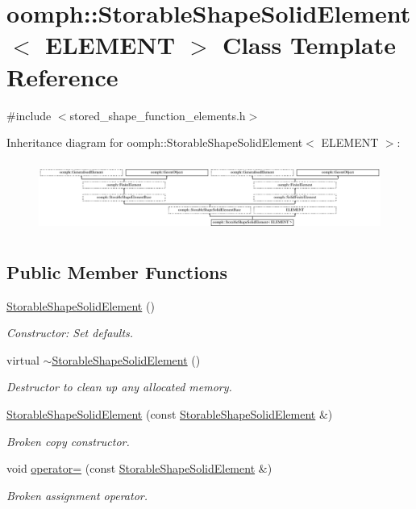 \hypertarget{classoomph_1_1StorableShapeSolidElement}{}\section{oomph\+:\+:Storable\+Shape\+Solid\+Element$<$ E\+L\+E\+M\+E\+NT $>$ Class Template Reference}
\label{classoomph_1_1StorableShapeSolidElement}


{\ttfamily \#include $<$stored\+\_\+shape\+\_\+function\+\_\+elements.\+h$>$}

Inheritance diagram for oomph\+:\+:Storable\+Shape\+Solid\+Element$<$ E\+L\+E\+M\+E\+NT $>$\+:\begin{figure}[H]
\begin{center}
\leavevmode
\includegraphics[height=2.333333cm]{classoomph_1_1StorableShapeSolidElement}
\end{center}
\end{figure}
\subsection*{Public Member Functions}
\begin{DoxyCompactItemize}
\item 
\hyperlink{classoomph_1_1StorableShapeSolidElement_a8f5bbc17bdcf01df0f9d924a67c0139d}{Storable\+Shape\+Solid\+Element} ()
\begin{DoxyCompactList}\small\item\em Constructor\+: Set defaults. \end{DoxyCompactList}\item 
virtual \hyperlink{classoomph_1_1StorableShapeSolidElement_ae5d33f517e64c4fcee7e07a6cf4e63bb}{$\sim$\+Storable\+Shape\+Solid\+Element} ()
\begin{DoxyCompactList}\small\item\em Destructor to clean up any allocated memory. \end{DoxyCompactList}\item 
\hyperlink{classoomph_1_1StorableShapeSolidElement_a7576ba483d40ebc5d9b93695a83c59ac}{Storable\+Shape\+Solid\+Element} (const \hyperlink{classoomph_1_1StorableShapeSolidElement}{Storable\+Shape\+Solid\+Element} \&)
\begin{DoxyCompactList}\small\item\em Broken copy constructor. \end{DoxyCompactList}\item 
void \hyperlink{classoomph_1_1StorableShapeSolidElement_a14294c89e5870f845215e3f04ef40883}{operator=} (const \hyperlink{classoomph_1_1StorableShapeSolidElement}{Storable\+Shape\+Solid\+Element} \&)
\begin{DoxyCompactList}\small\item\em Broken assignment operator. \end{DoxyCompactList}\end{DoxyCompactItemize}
